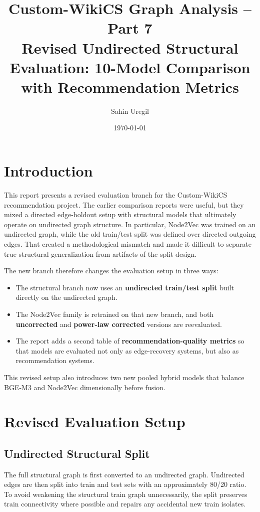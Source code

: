 \documentclass[11pt,a4paper]{article}
\title{Custom-WikiCS Graph Analysis -- Part 7\\[4pt]
\large Revised Undirected Structural Evaluation: 10-Model Comparison with Recommendation Metrics}
\author{Sahin Uregil}
\date{\today}
\begin{document}
\maketitle

\section{Introduction}
This report presents a revised evaluation branch for the Custom-WikiCS
recommendation project. The earlier comparison reports were useful, but they
mixed a directed edge-holdout setup with structural models that ultimately
operate on undirected graph structure. In particular, Node2Vec was trained on an
undirected graph, while the old train/test split was defined over directed
outgoing edges. That created a methodological mismatch and made it difficult to
separate true structural generalization from artifacts of the split design.

The new branch therefore changes the evaluation setup in three ways:

\begin{itemize}
    \item The structural branch now uses an \textbf{undirected train/test split}
          built directly on the undirected graph.
    \item The Node2Vec family is retrained on that new branch, and both
          \textbf{uncorrected} and \textbf{power-law corrected} versions are
          reevaluated.
    \item The report adds a second table of \textbf{recommendation-quality
          metrics} so that models are evaluated not only as edge-recovery
          systems, but also as recommendation systems.
\end{itemize}

This revised setup also introduces two new pooled hybrid models that balance
BGE-M3 and Node2Vec dimensionally before fusion.

\section{Revised Evaluation Setup}

\subsection{Undirected Structural Split}
The full structural graph is first converted to an undirected graph. Undirected
edges are then split into train and test sets with an approximately 80/20
ratio. To avoid weakening the structural train graph unnecessarily, the split
preserves train connectivity where possible and repairs any accidental new train
isolates.
\end{document}
